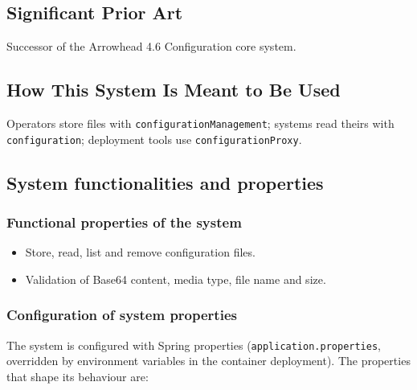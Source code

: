 \documentclass[a4paper]{arrowhead}
\begin{document}
\newpage

\subsection{Significant Prior Art}
\label{sec:prior_art}

Successor of the Arrowhead 4.6 Configuration core system.

\subsection{How This System Is Meant to Be Used}
\label{sec:use}

Operators store files with \texttt{configuration\allowbreak{}Management}; systems read theirs with \texttt{configuration}; deployment tools use \texttt{configurationProxy}.

\subsection{System functionalities and properties}
\label{sec:properties}

\subsubsection{Functional properties of the system}

\begin{itemize}
  \item Store, read, list and remove configuration files.
  \item Validation of Base64 content, media type, file name and size.
\end{itemize}

\subsubsection{Configuration of system properties}

The system is configured with Spring properties (\texttt{application.properties}, overridden by environment variables in the container deployment). The properties that shape its behaviour are:
\end{document}
